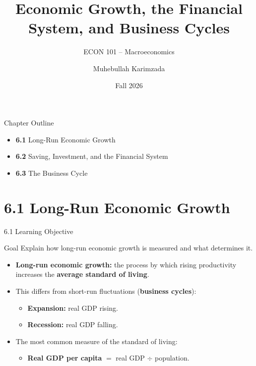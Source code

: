 \documentclass[aspectratio=169]{beamer}
\title{\textbf{Economic Growth, the Financial System, and Business Cycles}}
\subtitle{{\large ECON 101 -- Macroeconomics}}
\author{Muhebullah Karimzada}
\date{Fall 2026}
\begin{document}

\begin{frame}[plain]
  \titlepage
\end{frame}

\begin{frame}{Chapter Outline}
\transfade
\begin{itemize}[<+->]
  \item \textbf{6.1} Long-Run Economic Growth
  \item \textbf{6.2} Saving, Investment, and the Financial System
  \item \textbf{6.3} The Business Cycle
\end{itemize}
\end{frame}

\section{6.1 Long-Run Economic Growth}

\begin{frame}{6.1 Learning Objective}
\transfade
\begin{block}{Goal}
Explain how long-run economic growth is measured and what determines it.
\end{block}
\begin{itemize}[<+->]
  \item \textbf{Long-run economic growth:} the process by which rising \alert{productivity} increases the \textbf{average standard of living}.
  \item This differs from short-run fluctuations (\textbf{business cycles}):
  \begin{itemize}[<+->]
    \item \textbf{Expansion:} real GDP rising.
    \item \textbf{Recession:} real GDP falling.
  \end{itemize}
  \item The most common measure of the standard of living:
  \begin{itemize}[<+->]
    \item \textbf{Real GDP per capita} $=$ real GDP $\div$ population.
  \end{itemize}
\end{itemize}
\end{frame}
\end{document}
